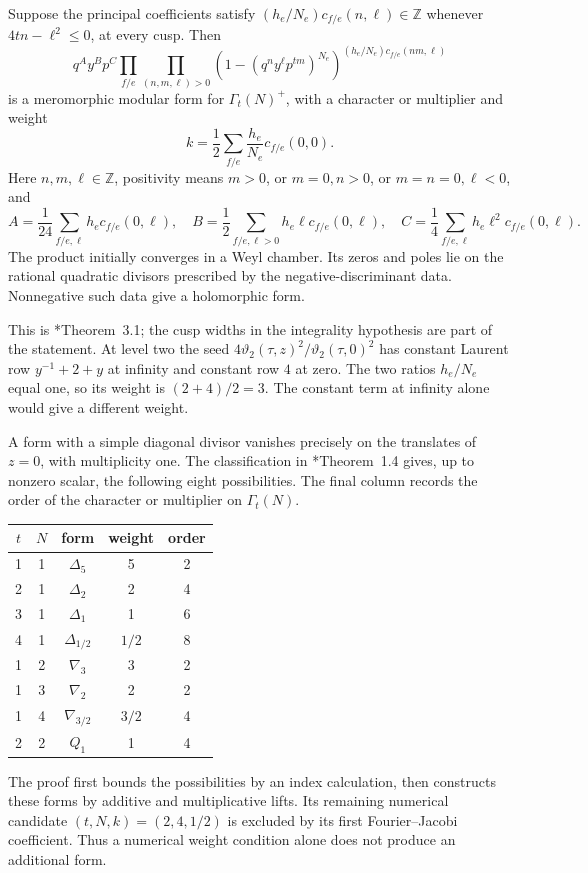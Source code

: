 \begin{theorem}\label{cyidx:thm:cusps}
Suppose the principal coefficients satisfy
\((h_e/N_e)c_{f/e}(n,\ell)\in\mathbb Z\) whenever
\(4tn-\ell^2\leq0\), at every cusp.
Then
\begin{equation}\label{cyidx:eq:cusp-product}
 q^Ay^Bp^C
 \prod_{f/e}\prod_{(n,m,\ell)>0}
 \left(1-(q^ny^\ell p^{tm})^{N_e}\right)^{
              (h_e/N_e)c_{f/e}(nm,\ell)}
\end{equation}
is a meromorphic modular form for \(\Gamma_t(N)^+\),
with a character or multiplier and weight
\begin{equation}\label{cyidx:eq:cusp-weight}
 k=\frac12\sum_{f/e}\frac{h_e}{N_e}c_{f/e}(0,0).
\end{equation}
Here \(n,m,\ell\in\mathbb Z\), positivity means
\(m>0\), or \(m=0,n>0\),
or \(m=n=0,\ell<0\), and
\[
 A=\frac1{24}\sum_{f/e,\ell}h_ec_{f/e}(0,\ell),\quad
 B=\frac12\sum_{f/e,\ell>0}h_e\ell c_{f/e}(0,\ell),\quad
 C=\frac14\sum_{f/e,\ell}h_e\ell^2c_{f/e}(0,\ell).
\]
The product initially converges in a Weyl chamber.
Its zeros and poles lie on the rational quadratic
divisors prescribed by the negative-discriminant data.
Nonnegative such data give a holomorphic form.
\end{theorem}

This is \cite{GC}*{Theorem~3.1}; the cusp widths in the
integrality hypothesis are part of the statement.
At level two the seed
\(4\vartheta_2(\tau,z)^2/\vartheta_2(\tau,0)^2\)
has constant Laurent row \(y^{-1}+2+y\) at infinity
and constant row \(4\) at zero. The two ratios
\(h_e/N_e\) equal one, so its weight is
\((2+4)/2=3\). The constant term at infinity alone
would give a different weight.

A form with a simple diagonal divisor vanishes precisely
on the translates of \(z=0\), with multiplicity one.
The classification in \cite{GC}*{Theorem~1.4} gives,
up to nonzero scalar, the following eight possibilities.
The final column records the order of the character or
multiplier on \(\Gamma_t(N)\).
\begin{center}
\begin{tabular}{c c c c c}
\(t\)&\(N\)&form&weight&order\\ \hline
1&1&\(\Delta_5\)&5&2\\
2&1&\(\Delta_2\)&2&4\\
3&1&\(\Delta_1\)&1&6\\
4&1&\(\Delta_{1/2}\)&\(1/2\)&8\\
1&2&\(\nabla_3\)&3&2\\
1&3&\(\nabla_2\)&2&2\\
1&4&\(\nabla_{3/2}\)&\(3/2\)&4\\
2&2&\(Q_1\)&1&4
\end{tabular}
\end{center}
The proof first bounds the possibilities by an index
calculation, then constructs these forms by additive and
multiplicative lifts. Its remaining numerical candidate
\((t,N,k)=(2,4,1/2)\) is excluded by its first
Fourier--Jacobi coefficient. Thus a numerical weight
condition alone does not produce an additional form.

